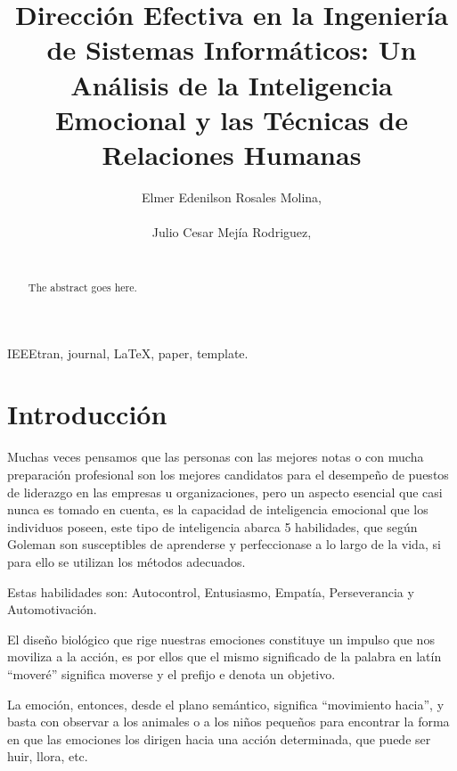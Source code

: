 \documentclass[journal]{IEEEtran}
\begin{document}
\title{Dirección Efectiva en la Ingeniería de Sistemas Informáticos: Un Análisis de la Inteligencia Emocional y las Técnicas de Relaciones Humanas}

\author{Elmer Edenilson Rosales Molina,\\ ~\\
        Julio Cesar Mejía Rodriguez,\\ ~}

\maketitle

\begin{abstract}
The abstract goes here.
\end{abstract}

\begin{keywords}
IEEEtran, journal, \LaTeX, paper, template.
\end{keywords}

\IEEEpeerreviewmaketitle

\section{Introducción}
Muchas veces pensamos que las personas con las mejores notas o con mucha preparación profesional son los mejores candidatos para el desempeño de puestos de liderazgo en las empresas u organizaciones, pero un aspecto esencial que casi nunca es tomado en cuenta, es la capacidad de inteligencia emocional que los individuos poseen, este tipo de inteligencia abarca 5 habilidades, que según Goleman son susceptibles de aprenderse y perfeccionase a lo largo de la vida, si para ello se utilizan los métodos adecuados.

Estas habilidades son: Autocontrol, Entusiasmo, Empatía, Perseverancia y Automotivación. 

El diseño biológico que rige nuestras emociones constituye un impulso que nos moviliza a la acción, es por ellos que el mismo significado de la palabra en latín “moveré” significa moverse y el prefijo e denota un objetivo.

La emoción, entonces, desde el plano semántico, significa “movimiento hacia”, y basta con observar a los animales o a los niños pequeños para encontrar la forma en que las emociones los dirigen hacia una acción determinada, que puede ser huir, llora, etc.
\end{document}
